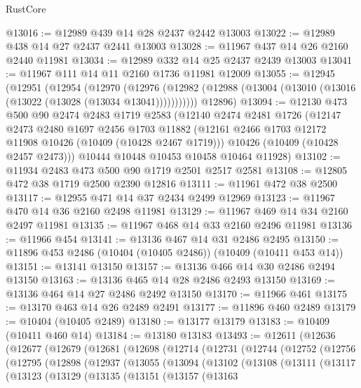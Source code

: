 \begin{lexlean}{RustCore}
\begin{coremodule}
@13016 := @12989 @439 @14 @28 @2437 @2442 @13003
@13022 := @12989 @438 @14 @27 @2437 @2441 @13003
@13028 := @11967 @437 @14 @26 @2160 @2440 @11981
@13034 := @12989 @332 @14 @25 @2437 @2439 @13003
@13041 := @11967 @111 @14 @11 @2160 @1736 @11981 @12009
@13055 := @12945
    (@12951
      (@12954
        (@12970
          (@12976 (@12982 (@12988 (@13004 (@13010 (@13016 (@13022 (@13028 (@13034 @13041)))))))))))
      @12896)
@13094 := @12130
    @473
    @500
    @90
    @2474
    @2483
    @1719
    @2583
    (@12140
      @2474
      @2481
      @1726
      (@12147
        @2473
        @2480
        @1697
        @2456
        @1703
        @11882
        (@12161 @2466 @1703 @12172 @11908 @10426 (@10409 (@10428 @2467 @1719)))
        @10426
        (@10409 (@10428 @2457 @2473)))
      @10444
      @10448
      @10453
      @10458
      @10464
      @11928)
@13102 := @11934 @2483 @473 @500 @90 @1719 @2501 @2517 @2581
@13108 := @12805 @472 @38 @1719 @2500 @2390 @12816
@13111 := @11961 @472 @38 @2500
@13117 := @12955 @471 @14 @37 @2434 @2499 @12969
@13123 := @11967 @470 @14 @36 @2160 @2498 @11981
@13129 := @11967 @469 @14 @34 @2160 @2497 @11981
@13135 := @11967 @468 @14 @33 @2160 @2496 @11981
@13136 := @11966 @454
@13141 := @13136 @467 @14 @31 @2486 @2495
@13150 := @11896 @453 @2486 (@10404 (@10405 @2486)) (@10409 (@10411 @453 @14))
@13151 := @13141 @13150
@13157 := @13136 @466 @14 @30 @2486 @2494 @13150
@13163 := @13136 @465 @14 @28 @2486 @2493 @13150
@13169 := @13136 @464 @14 @27 @2486 @2492 @13150
@13170 := @11966 @461
@13175 := @13170 @463 @14 @26 @2489 @2491
@13177 := @11896 @460 @2489
@13179 := @10404 (@10405 @2489)
@13180 := @13177 @13179
@13183 := @10409 (@10411 @460 @14)
@13184 := @13180 @13183
@13493 := @12611
    (@12636
      (@12677
        (@12679
          (@12681
            (@12698
              (@12714
                (@12731
                  (@12744
                    (@12752
                      (@12756
                        (@12795
                          (@12898
                            (@12937
                              (@13055
                                (@13094
                                  (@13102
                                    (@13108
                                      (@13111
                                        (@13117
                                          (@13123
                                            (@13129
                                              (@13135
                                                (@13151
                                                  (@13157
                                                    (@13163

\end{coremodule}
\end{lexlean}
